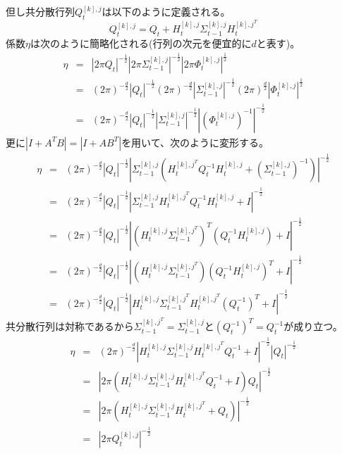 \documentclass[dvipdfmx,a4paper]{jsarticle}
\begin{document}
但し共分散行列$Q_t^{[k], j}$は以下のように定義される。
\begin{equation}
	Q_t^{[k], j} = Q_t + H_t^{[k], j} \Sigma_{t - 1}^{[k], j} H_t^{{[k], j}^T}
\end{equation}
係数$\eta$は次のように簡略化される(行列の次元を便宜的に$d$と表す)。
\begin{eqnarray}
	\eta &=& |2 \pi Q_t|^{-\frac{1}{2}} |2 \pi \Sigma_{t - 1}^{[k], j}|^{-\frac{1}{2}} |2 \pi \Phi_t^{[k], j}|^\frac{1}{2} \nonumber \\
	&=& \left( 2 \pi \right)^{-\frac{d}{2}} |Q_t|^{-\frac{1}{2}} \left( 2 \pi \right)^{-\frac{d}{2}} |\Sigma_{t - 1}^{[k], j}|^{-\frac{1}{2}} \left( 2 \pi \right)^\frac{d}{2} |\Phi_t^{[k], j}|^\frac{1}{2} \nonumber \\
	&=& \left( 2 \pi \right)^{-\frac{d}{2}} |Q_t|^{-\frac{1}{2}} |\Sigma_{t - 1}^{[k], j}|^{-\frac{1}{2}} \left| \left( \Phi_t^{[k], j} \right)^{-1} \right|^{-\frac{1}{2}} \nonumber
\end{eqnarray}
更に$\left| I + A^T B \right| = \left| I + A B^T \right|$を用いて、次のように変形する。
\begin{eqnarray}
	\eta &=& \left( 2 \pi \right)^{-\frac{d}{2}} |Q_t|^{-\frac{1}{2}} \left| \Sigma_{t - 1}^{[k], j} \left( H_t^{{[k], j}^T} Q_t^{-1} H_t^{[k], j} + \left( \Sigma_{t - 1}^{[k], j} \right)^{-1} \right) \right|^{-\frac{1}{2}} \nonumber \\
	&=& \left( 2 \pi \right)^{-\frac{d}{2}} |Q_t|^{-\frac{1}{2}} \left| \Sigma_{t - 1}^{[k], j} H_t^{{[k], j}^T} Q_t^{-1} H_t^{[k], j} + I \right|^{-\frac{1}{2}} \nonumber \\
	&=& \left( 2 \pi \right)^{-\frac{d}{2}} |Q_t|^{-\frac{1}{2}} \left| \left( H_t^{[k], j} \Sigma_{t - 1}^{{[k], j}^T} \right)^T \left( Q_t^{-1} H_t^{[k], j} \right) + I \right|^{-\frac{1}{2}} \nonumber \\
	&=& \left( 2 \pi \right)^{-\frac{d}{2}} |Q_t|^{-\frac{1}{2}} \left| \left( H_t^{[k], j} \Sigma_{t - 1}^{{[k], j}^T} \right) \left( Q_t^{-1} H_t^{[k], j} \right)^T + I \right|^{-\frac{1}{2}} \nonumber \\
	&=& \left( 2 \pi \right)^{-\frac{d}{2}} |Q_t|^{-\frac{1}{2}} \left| H_t^{[k], j} \Sigma_{t - 1}^{{[k], j}^T} H_t^{{[k], j}^T} \left( Q_t^{-1} \right)^T + I \right|^{-\frac{1}{2}} \nonumber
\end{eqnarray}
共分散行列は対称であるから$\Sigma_{t - 1}^{{[k], j}^T} = \Sigma_{t - 1}^{[k], j}$と$\left( Q_t^{-1} \right)^T = Q_t^{-1}$が成り立つ。
\begin{eqnarray}
	\eta &=& \left( 2 \pi \right)^{-\frac{d}{2}} \left| H_t^{[k], j} \Sigma_{t - 1}^{[k], j} H_t^{{[k], j}^T} Q_t^{-1} + I \right|^{-\frac{1}{2}} |Q_t|^{-\frac{1}{2}} \nonumber \\
	&=& \left| 2 \pi \left( H_t^{[k], j} \Sigma_{t - 1}^{[k], j} H_t^{{[k], j}^T} Q_t^{-1} + I \right) Q_t \right|^{-\frac{1}{2}} \nonumber \\
	&=& \left| 2 \pi \left( H_t^{[k], j} \Sigma_{t - 1}^{[k], j} H_t^{{[k], j}^T} + Q_t \right) \right|^{-\frac{1}{2}} \nonumber \\
	&=& \left| 2 \pi Q_t^{[k], j} \right|^{-\frac{1}{2}}
\end{eqnarray}
\end{document}
